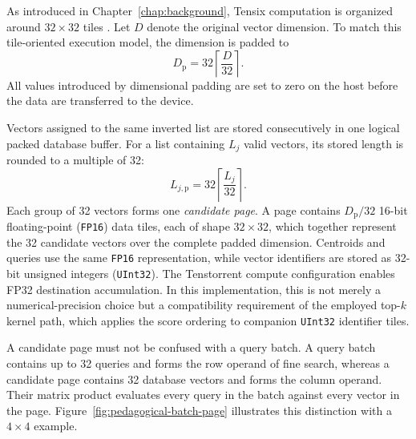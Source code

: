 As introduced in Chapter~\ref{chap:background}, Tensix computation is organized around \(32\times32\) tiles \cite{tenstorrent_metalium_architecture}. Let \(D\) denote the original vector dimension. To match this tile-oriented execution model, the dimension is padded to
\begin{equation}
D_{\mathrm{p}}=32\left\lceil\frac{D}{32}\right\rceil.
\label{eq:dimension-padding}
\end{equation}
All values introduced by dimensional padding are set to zero on the host before the data are transferred to the device.

Vectors assigned to the same inverted list are stored consecutively in one logical packed database buffer. For a list containing \(L_j\) valid vectors, its stored length is rounded to a multiple of 32:
\begin{equation}
L_{j,\mathrm{p}}=32\left\lceil\frac{L_j}{32}\right\rceil.
\label{eq:list-padding}
\end{equation}
Each group of 32 vectors forms one \emph{candidate page}. A page contains \(D_{\mathrm{p}}/32\) 16-bit floating-point (\texttt{FP16}) data tiles, each of shape \(32\times32\), which together represent the 32 candidate vectors over the complete padded dimension. Centroids and queries use the same \texttt{FP16} representation, while vector identifiers are stored as 32-bit unsigned integers (\texttt{UInt32}). The Tenstorrent compute configuration enables FP32 destination accumulation. In this implementation, this is not merely a numerical-precision choice but a compatibility requirement of the employed top-\(k\) kernel path, which applies the score ordering to companion \texttt{UInt32} identifier tiles.

A candidate page must not be confused with a query batch. A query batch contains up to 32 queries and forms the row operand of fine search, whereas a candidate page contains 32 database vectors and forms the column operand. Their matrix product evaluates every query in the batch against every vector in the page. Figure~\ref{fig:pedagogical-batch-page} illustrates this distinction with a \(4\times4\) example.

